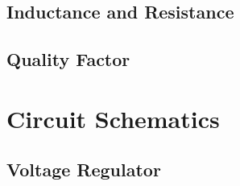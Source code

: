 \section{Inductance and Resistance}\label{sec:RL}




\section{Quality Factor}








\chapter{Circuit Schematics}

\section{Voltage Regulator}\label{Appendix: DC-DC}


